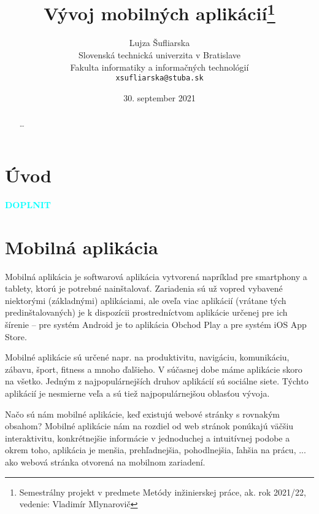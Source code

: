 \documentclass[10pt,twoside,slovak,a4paper]{article}
\title{Vývoj mobilných aplikácií\thanks{Semestrálny projekt v predmete Metódy inžinierskej práce, ak. rok 2021/22, vedenie: Vladimír Mlynarovič}} %
\author{Lujza Šufliarska\\[2pt]
	{\small Slovenská technická univerzita v Bratislave}\\
	{\small Fakulta informatiky a informačných technológií}\\
	{\small \texttt{xsufliarska@stuba.sk}}
	}
\date{\small 30. september 2021} %
\begin{document}
\maketitle

\begin{abstract}

\ldots
\end{abstract}



\section{Úvod}



\vspace{1.5cm}
\textcolor{cyan}{{\textbf{\huge DOPLNIT}}}
\vspace{1.5cm}






\section{Mobilná aplikácia}
\quad Mobilná aplikácia je softwarová aplikácia vytvorená napríklad pre smartphony a tablety, ktorú je potrebné nainštalovať. Zariadenia sú už vopred vybavené niektorými (základnými) aplikáciami, ale oveľa viac aplikácií (vrátane tých predinštalovaných) je k dispozícii prostredníctvom aplikácie určenej pre ich šírenie – pre systém Android je to aplikácia Obchod Play a pre systém iOS App Store.

Mobilné aplikácie sú určené napr. na produktivitu, navigáciu, komunikáciu, zábavu, šport, fitness a mnoho ďalšieho. V súčasnej dobe máme aplikácie skoro na všetko. Jedným z najpopulárnejších druhov aplikácií sú sociálne siete. Týchto aplikácií je nesmierne veľa a sú tiež najpopulárnejšou oblasťou vývoja.

Načo sú nám mobilné aplikácie, keď existujú webové stránky s rovnakým obsahom? Mobilné aplikácie nám na rozdiel od web stránok ponúkajú väčšiu interaktivitu, konkrétnejšie informácie v jednoduchej a intuitívnej podobe a okrem toho, aplikácia je menšia, prehľadnejšia, pohodlnejšia, ľahšia na prácu, ... ako webová stránka otvorená na mobilnom zariadení.	\cite{eYewated1, eliteml, amazon}
\end{document}
